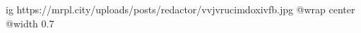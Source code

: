  
 
 
 
 

\ifcmt
  ig https://mrpl.city/uploads/posts/redactor/vvjvrucimdoxivfb.jpg
  @wrap center
  @width 0.7
\fi
